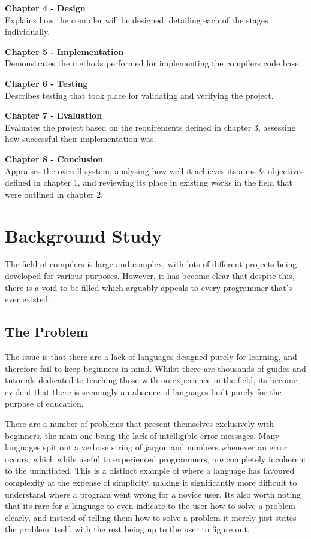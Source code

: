 \documentclass[
]{report}
\begin{document}
\textbf{Chapter 4 - Design}\\
Explains how the compiler will be designed, detailing each of the stages
individually.

\textbf{Chapter 5 - Implementation}\\
Demonstrates the methods performed for implementing the compilers code
base.

\textbf{Chapter 6 - Testing}\\
Describes testing that took place for validating and verifying the
project.

\textbf{Chapter 7 - Evaluation}\\
Evaluates the project based on the requirements defined in chapter 3,
assessing how successful their implementation was.

\textbf{Chapter 8 - Conclusion}\\
Appraises the overall system, analysing how well it achieves its aims \&
objectives defined in chapter 1, and reviewing its place in existing
works in the field that were outlined in chapter 2.


\chapter{Background Study}
The field of compilers is large and complex, with lots of different
projects being developed for various purposes. However, it has become
clear that despite this, there is a void to be filled which arguably
appeals to every programmer that's ever existed.

\section{The Problem}
The issue is that there are a lack of languages designed purely for
learning, and therefore fail to keep beginners in mind. Whilst there are
thousands of guides and tutorials dedicated to teaching those with no
experience in the field, its become evident that there is seemingly an
absence of languages built purely for the purpose of education.

There are a number of problems that present themselves exclusively with
beginners, the main one being the lack of intelligible error messages.
Many languages spit out a verbose string of jargon and numbers whenever
an error occurs, which while useful to experienced programmers, are
completely incoherent to the uninitiated. This is a distinct example of
where a language has favoured complexity at the expense of simplicity,
making it significantly more difficult to understand where a program
went wrong for a novice user. Its also worth noting that its rare for a
language to even indicate to the user how to solve a problem clearly,
and instead of telling them how to solve a problem it merely just states
the problem itself, with the rest being up to the user to figure out.
\end{document}
